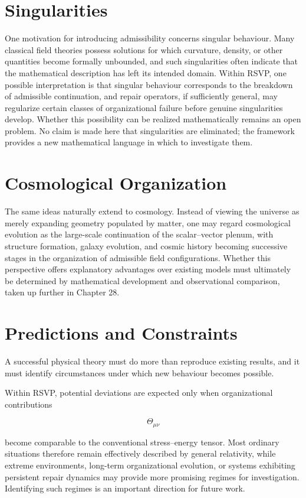 \documentclass[11pt,oneside]{book}
\numberwithin{equation}{chapter}
\theoremstyle{definition}
\theoremstyle{plain}
\begin{document}
\section{Singularities}

One motivation for introducing admissibility concerns singular behaviour. Many classical field theories possess solutions for which curvature, density, or other quantities become formally unbounded, and such singularities often indicate that the mathematical description has left its intended domain. Within RSVP, one possible interpretation is that singular behaviour corresponds to the breakdown of admissible continuation, and repair operators, if sufficiently general, may regularize certain classes of organizational failure before genuine singularities develop. Whether this possibility can be realized mathematically remains an open problem. No claim is made here that singularities are eliminated; the framework provides a new mathematical language in which to investigate them.

\section{Cosmological Organization}

The same ideas naturally extend to cosmology. Instead of viewing the universe as merely expanding geometry populated by matter, one may regard cosmological evolution as the large-scale continuation of the scalar--vector plenum, with structure formation, galaxy evolution, and cosmic history becoming successive stages in the organization of admissible field configurations. Whether this perspective offers explanatory advantages over existing models must ultimately be determined by mathematical development and observational comparison, taken up further in Chapter 28.

\section{Predictions and Constraints}

A successful physical theory must do more than reproduce existing results, and it must identify circumstances under which new behaviour becomes possible.

Within RSVP, potential deviations are expected only when organizational
contributions

\[
\Theta_{\mu\nu}
\]

become comparable to the conventional stress--energy tensor. Most ordinary situations therefore remain effectively described by general relativity, while extreme environments, long-term organizational evolution, or systems exhibiting persistent repair dynamics may provide more promising regimes for investigation. Identifying such regimes is an important direction for future work.
\end{document}
